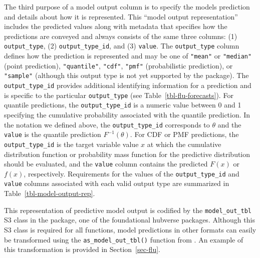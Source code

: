 \documentclass[
  article,
  shortnames,
  notitle]{jss}
\begin{document}
\begin{longtable}[]
\caption{\label{tbl-example-scenarios}Example of scenario projections
for cumulative COVID-19 deaths, formatted according to hubverse
standards. Quantile predictions for the median and 50\% prediction
intervals from a single model are shown for four distinct scenarios. The
\texttt{location} and \texttt{origin\_date} columns have been omitted
for brevity; all forecasts in this example were made on 2021-03-07 for
the US. This example is a subset of the
\texttt{example-complex-scenario-hub} data provided by the
hubverse\citep{hubverse_docs}.}

\tabularnewline
\end{longtable}

The third purpose of a model output column is to specify the models
prediction and details about how it is represented. This ``model output
representation'' includes the predicted values along with metadata that
specifies how the predictions are conveyed and always consists of the
same three columns: (1) \texttt{output\_type}, (2)
\texttt{output\_type\_id}, and (3) \texttt{value}. The
\texttt{output\_type} column defines how the prediction is represented
and may be one of \texttt{"mean"} or \texttt{"median"} (point
prediction), \texttt{"quantile"}, \texttt{"cdf"}, \texttt{"pmf"}
(probabilistic prediction), or \texttt{"sample"} (although this output
type is not yet supported by the  package). The
\texttt{output\_type\_id} provides additional identifying information
for a prediction and is specific to the particular \texttt{output\_type}
(see Table~\ref{tbl-flu-forecasts}). For quantile predictions, the
\texttt{output\_type\_id} is a numeric value between 0 and 1 specifying
the cumulative probability associated with the quantile prediction. In
the notation we defined above, the \texttt{output\_type\_id} corresponds
to \(\theta\) and the \texttt{value} is the quantile prediction
\(F^{-1}(\theta)\). For CDF or PMF predictions, the
\texttt{output\_type\_id} is the target variable value \(x\) at which
the cumulative distribution function or probability mass function for
the predictive distribution should be evaluated, and the \texttt{value}
column contains the predicted \(F(x)\) or \(f(x)\), respectively.
Requirements for the values of the \texttt{output\_type\_id} and
\texttt{value} columns associated with each valid output type are
summarized in Table~\ref{tbl-model-output-rep}.

This representation of predictive model output is codified by the
\texttt{model\_out\_tbl} S3 class in the  package, one of
the foundational hubverse packages. Although this S3 class is required
for all  functions, model predictions in other formats
can easily be transformed using the \texttt{as\_model\_out\_tbl()}
function from . An example of this transformation is
provided in Section~\ref{sec-flu}.
\end{document}

